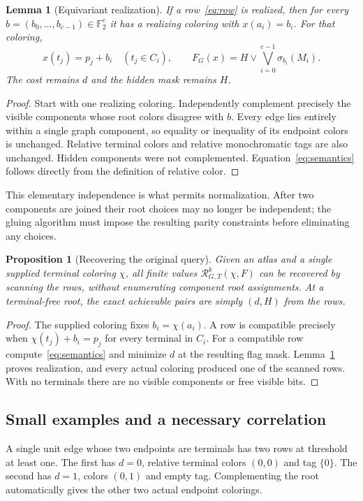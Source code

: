 \documentclass[11pt,letterpaper]{article}
\newtheorem{lemma}[theorem]{Lemma}
\newtheorem{proposition}[theorem]{Proposition}
\theoremstyle{definition}
\theoremstyle{remark}\newtheorem{remark}[theorem]{Remark}
\newcommand{\F}{\mathbb F}
\newcommand{\Resp}{\mathcal R}
\newcommand{\sw}{\sigma}
\begin{document}
\begin{lemma}[Equivariant realization]\label{lem:equivariant}
If a row~\eqref{eq:row} is realized, then for every $b=(b_0,\ldots,b_{c-1})\in\F_2^c$ it has a realizing coloring with $x(a_i)=b_i$. For that coloring,
\begin{equation}\label{eq:semantics}
 x(t_j)=p_j+b_i\quad(t_j\in C_i),\qquad
 F_G(x)=H\mathbin{\lor}\bigvee_{i=0}^{c-1}\sw_{b_i}(M_i).
\end{equation}
The cost remains $d$ and the hidden mask remains $H$.
\end{lemma}
\begin{proof}
Start with one realizing coloring. Independently complement precisely the visible components whose root colors disagree with $b$. Every edge lies entirely within a single graph component, so equality or inequality of its endpoint colors is unchanged. Relative terminal colors and relative monochromatic tags are also unchanged. Hidden components were not complemented. Equation~\eqref{eq:semantics} follows directly from the definition of relative color.
\end{proof}
This elementary independence is what permits normalization. After two components are joined their root choices may no longer be independent; the gluing algorithm must impose the resulting parity constraints before eliminating any choices.

\begin{proposition}[Recovering the original query]\label{prop:recover}
Given an atlas and a single supplied terminal coloring $\chi$, all finite values $\Resp^k_{G,T}(\chi,F)$ can be recovered by scanning the rows, without enumerating component root assignments. At a terminal-free root, the exact achievable pairs are simply $(d,H)$ from the rows.
\end{proposition}
\begin{proof}
The supplied coloring fixes $b_i=\chi(a_i)$. A row is compatible precisely when $\chi(t_j)+b_i=p_j$ for every terminal in $C_i$. For a compatible row compute~\eqref{eq:semantics} and minimize $d$ at the resulting flag mask. Lemma~\ref{lem:equivariant} proves realization, and every actual coloring produced one of the scanned rows. With no terminals there are no visible components or free visible bits.
\end{proof}

\subsection{Small examples and a necessary correlation}
A single unit edge whose two endpoints are terminals has two rows at threshold at least one. The first has $d=0$, relative terminal colors $(0,0)$ and tag $\{0\}$. The second has $d=1$, colors $(0,1)$ and empty tag. Complementing the root automatically gives the other two actual endpoint colorings.
\end{document}
